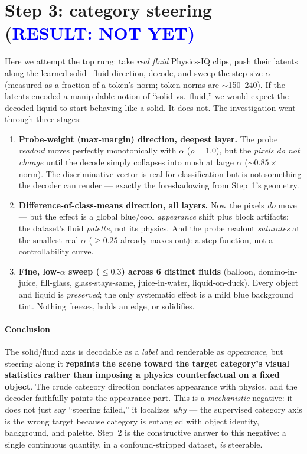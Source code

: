 \documentclass{article} %
\newcommand{\alphanorm}{\ensuremath{\alpha}}        %
\begin{document}
\section{Step 3: category steering (\textcolor{blue}{RESULT: NOT YET)}}
\label{sec:step3}

Here we attempt the top rung: take \emph{real fluid} Physics-IQ clips, push
their latents along the learned solid$-$fluid direction, decode, and sweep the step size \alphanorm{}
(measured as a fraction of a token's norm; token norms are $\sim$150--240). If the latents encoded a
manipulable notion of ``solid vs.\ fluid,'' we would expect the decoded liquid to start behaving like a
solid. It does not. The investigation went through three stages:

\begin{enumerate}
\item \textbf{Probe-weight (max-margin) direction, deepest layer.} The probe \emph{readout} moves
perfectly monotonically with \alphanorm{} ($\rho=1.0$), but the \emph{pixels do not change} until the
decode simply collapses into mush at large \alphanorm{} ($\sim 0.85\times$norm). The discriminative
vector is real for classification but is not something the decoder can render --- exactly the
foreshadowing from Step~1's geometry.
\item \textbf{Difference-of-class-means direction, all layers.} Now the pixels \emph{do} move --- but
the effect is a global blue/cool \emph{appearance} shift plus block artifacts: the dataset's fluid
\emph{palette}, not its physics. And the probe readout \emph{saturates} at the smallest real
\alphanorm{} ($\geq 0.25$ already maxes out): a step function, not a controllability curve.
\item \textbf{Fine, low-\alphanorm{} sweep ($\leq 0.3$) across 6 distinct fluids} (balloon,
domino-in-juice, fill-glass, glass-stays-same, juice-in-water, liquid-on-duck). Every object and liquid
is \emph{preserved}; the only systematic effect is a mild blue background tint. Nothing freezes, holds
an edge, or solidifies.
\end{enumerate}

\paragraph{Conclusion}
The solid/fluid axis is decodable as a \emph{label} and renderable as \emph{appearance}, but steering
along it \textbf{repaints the scene toward the target category's visual statistics rather than imposing
a physics counterfactual on a fixed object}. The crude category direction conflates appearance with
physics, and the decoder faithfully paints the appearance part. This is a \emph{mechanistic} negative:
it does not just say ``steering failed,'' it localizes \emph{why} --- the supervised category axis is
the wrong target because category is entangled with object identity, background, and palette. Step~2 is
the constructive answer to this negative: a single continuous quantity, in a confound-stripped dataset,
\emph{is} steerable.
\end{document}
